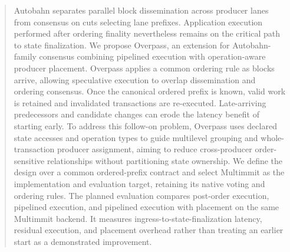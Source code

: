 \begin{abstract}
Autobahn separates parallel block dissemination across producer lanes from consensus on cuts selecting lane prefixes. Application execution performed after ordering finality nevertheless remains on the critical path to state finalization. We propose Overpass, an extension for Autobahn-family consensus combining pipelined execution with operation-aware producer placement. Overpass applies a common ordering rule as blocks arrive, allowing speculative execution to overlap dissemination and ordering consensus. Once the canonical ordered prefix is known, valid work is retained and invalidated transactions are re-executed. Late-arriving predecessors and candidate changes can erode the latency benefit of starting early. To address this follow-on problem, Overpass uses declared state accesses and operation types to guide multilevel grouping and whole-transaction producer assignment, aiming to reduce cross-producer order-sensitive relationships without partitioning state ownership. We define the design over a common ordered-prefix contract and select Multimmit as the implementation and evaluation target, retaining its native voting and ordering rules. The planned evaluation compares post-order execution, pipelined execution, and pipelined execution with placement on the same Multimmit backend. It measures ingress-to-state-finalization latency, residual execution, and placement overhead rather than treating an earlier start as a demonstrated improvement.
\end{abstract}


